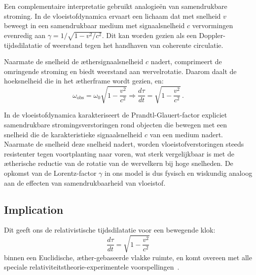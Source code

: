Een complementaire interpretatie gebruikt analogieën van samendrukbare stroming. In de vloeistofdynamica ervaart een lichaam dat met snelheid $v$ beweegt in een samendrukbaar medium met signaalsnelheid $c$ vervormingen evenredig aan $\gamma = 1/\sqrt{1 - v^2/c^2}$. Dit kan worden gezien als een Doppler-tijdsdilatatie of weerstand tegen het handhaven van coherente circulatie.

Naarmate de snelheid de æthersignaalsnelheid $c$ nadert, comprimeert de omringende stroming en biedt weerstand aan wervelrotatie. Daarom daalt de hoeksnelheid die in het ætherframe wordt gezien, en:
\[
    \omega_{\text{obs}} = \omega_0 \sqrt{1 - \frac{v^2}{c^2}} \Rightarrow \frac{d\tau}{dt} = \sqrt{1 - \frac{v^2}{c^2}} \,. \tag{3}
\]

In de vloeistofdynamica karakteriseert de Prandtl-Glauert-factor expliciet samendrukbare stromingsverstoringen rond objecten die bewegen met een snelheid die de karakteristieke signaalsnelheid $c$ van een medium nadert. Naarmate de snelheid deze snelheid nadert, worden vloeistofverstoringen steeds resistenter tegen voortplanting naar voren, wat sterk vergelijkbaar is met de ætherische reductie van de rotatie van de wervelkern bij hoge snelheden. De opkomst van de Lorentz-factor $\gamma$ in ons model is dus fysisch en wiskundig analoog aan de effecten van samendrukbaarheid van vloeistof.

\subsection*{Implication}

Dit geeft ons de relativistische tijdsdilatatie voor een bewegende klok:
\[
    \boxed{\frac{d\tau}{dt} = \sqrt{1 - \frac{v^2}{c^2}}}
\]
binnen een Euclidische, æther-gebaseerde vlakke ruimte, en komt overeen met alle speciale relativiteitstheorie-experimentele voorspellingen~\cite{Rado2020-aether-Lorentz,Levy2009-aether-clock}.